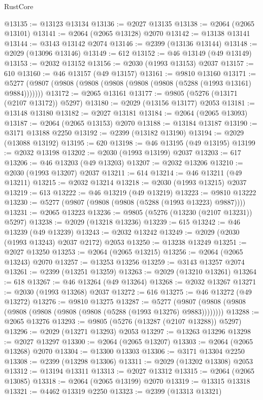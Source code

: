 \begin{lexlean}{RustCore}
\begin{coremodule}
@13135 := @13123 @13134
@13136 := @2027 @13135
@13138 := @2064 (@2065 @13101)
@13141 := @2064 (@2065 @13128) @2070
@13142 := @13138 @13141
@13144 := @3143 @13142 @2074
@13146 := @2399 (@13136 @13144)
@13148 := @2029 (@13096 @13146)
@13149 := 612
@13152 := @46 @13149 (@49 @13149)
@13153 := @2032 @13152
@13156 := @2030 (@1993 @13153) @2037
@13157 := 610
@13160 := @46 @13157 (@49 @13157)
@13161 := @9810 @13160
@13171 := @5277 (@9807 (@9808 (@9808 (@9808 (@9808 (@9808 (@5288 (@1993 @13161) @9884)))))))
@13172 := @2065 @13161
@13177 := @9805 (@5276 (@13171 (@2107 @13172)) @5297)
@13180 := @2029 (@13156 @13177) @2053
@13181 := @13148 @13180
@13182 := @2027 @13181
@13184 := @2064 (@2065 @13093)
@13187 := @2064 (@2065 @13153) @2070
@13188 := @13184 @13187
@13190 := @3171 @13188 @2250
@13192 := @2399 (@13182 @13190)
@13194 := @2029 (@13088 @13192)
@13195 := 620
@13198 := @46 @13195 (@49 @13195)
@13199 := @2032 @13198
@13202 := @2030 (@1993 @13199) @2037
@13203 := 617
@13206 := @46 @13203 (@49 @13203)
@13207 := @2032 @13206
@13210 := @2030 (@1993 @13207) @2037
@13211 := 614
@13214 := @46 @13211 (@49 @13211)
@13215 := @2032 @13214
@13218 := @2030 (@1993 @13215) @2037
@13219 := 613
@13222 := @46 @13219 (@49 @13219)
@13223 := @9810 @13222
@13230 := @5277 (@9807 (@9808 (@9808 (@5288 (@1993 @13223) @9887))))
@13231 := @2065 @13223
@13236 := @9805 (@5276 (@13230 (@2107 @13231)) @5297)
@13238 := @2029 (@13218 @13236)
@13239 := 615
@13242 := @46 @13239 (@49 @13239)
@13243 := @2032 @13242
@13249 := @2029 (@2030 (@1993 @13243) @2037 @2172) @2053
@13250 := @13238 @13249
@13251 := @2027 @13250
@13253 := @2064 (@2065 @13215)
@13256 := @2064 (@2065 @13243) @2070
@13257 := @13253 @13256
@13259 := @3143 @13257 @2074
@13261 := @2399 (@13251 @13259)
@13263 := @2029 (@13210 @13261)
@13264 := 618
@13267 := @46 @13264 (@49 @13264)
@13268 := @2032 @13267
@13271 := @2030 (@1993 @13268) @2037
@13272 := 616
@13275 := @46 @13272 (@49 @13272)
@13276 := @9810 @13275
@13287 := @5277 (@9807 (@9808 (@9808 (@9808 (@9808 (@9808 (@9808 (@5288 (@1993 @13276) @9883))))))))
@13288 := @2065 @13276
@13293 := @9805 (@5276 (@13287 (@2107 @13288)) @5297)
@13296 := @2029 (@13271 @13293) @2053
@13297 := @13263 @13296
@13298 := @2027 @13297
@13300 := @2064 (@2065 @13207)
@13303 := @2064 (@2065 @13268) @2070
@13304 := @13300 @13303
@13306 := @3171 @13304 @2250
@13308 := @2399 (@13298 @13306)
@13311 := @2029 (@13202 @13308) @2053
@13312 := @13194 @13311
@13313 := @2027 @13312
@13315 := @2064 (@2065 @13085)
@13318 := @2064 (@2065 @13199) @2070
@13319 := @13315 @13318
@13321 := @4462 @13319 @2250
@13323 := @2399 (@13313 @13321)

\end{coremodule}
\end{lexlean}
